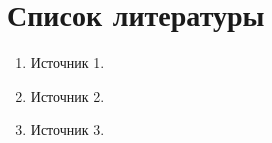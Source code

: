\section*{Список литературы}

\begin{enumerate}
\item Источник 1.
\item Источник 2.
\item Источник 3.
\end{enumerate}
